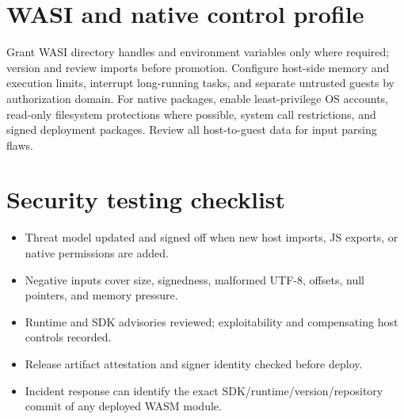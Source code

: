 \documentclass[11pt,letterpaper]{article}
\begin{document}
\section{WASI and native control profile}
Grant WASI directory handles and environment variables only where required; version and review imports before promotion. Configure host-side memory and execution limits, interrupt long-running tasks, and separate untrusted guests by authorization domain. For native packages, enable least-privilege OS accounts, read-only filesystem protections where possible, system call restrictions, and signed deployment packages. Review all host-to-guest data for input parsing flaws.

\section{Security testing checklist}
\begin{itemize}
\item Threat model updated and signed off when new host imports, JS exports, or native permissions are added.
\item Negative inputs cover size, signedness, malformed UTF-8, offsets, null pointers, and memory pressure.
\item Runtime and SDK advisories reviewed; exploitability and compensating host controls recorded.
\item Release artifact attestation and signer identity checked before deploy.
\item Incident response can identify the exact SDK/runtime/version/repository commit of any deployed WASM module.
\end{itemize}
\end{document}
